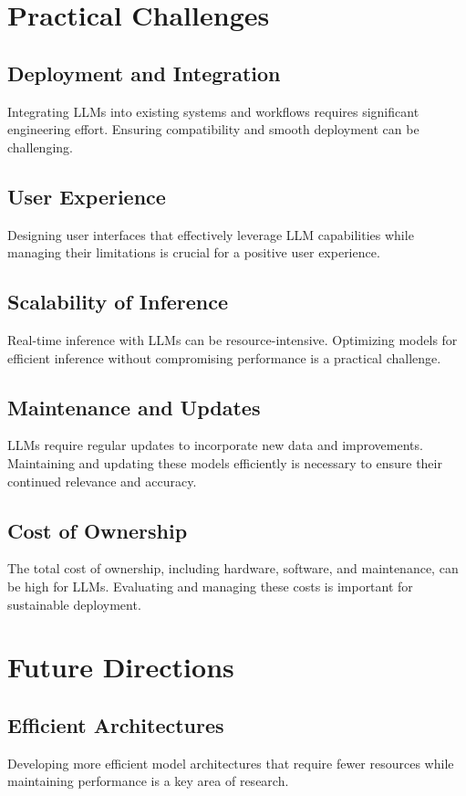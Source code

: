 \section{Practical Challenges}

\subsection{Deployment and Integration}
Integrating LLMs into existing systems and workflows requires significant engineering effort. Ensuring compatibility and smooth deployment can be challenging.

\subsection{User Experience}
Designing user interfaces that effectively leverage LLM capabilities while managing their limitations is crucial for a positive user experience.

\subsection{Scalability of Inference}
Real-time inference with LLMs can be resource-intensive. Optimizing models for efficient inference without compromising performance is a practical challenge.

\subsection{Maintenance and Updates}
LLMs require regular updates to incorporate new data and improvements. Maintaining and updating these models efficiently is necessary to ensure their continued relevance and accuracy.

\subsection{Cost of Ownership}
The total cost of ownership, including hardware, software, and maintenance, can be high for LLMs. Evaluating and managing these costs is important for sustainable deployment.

\section{Future Directions}

\subsection{Efficient Architectures}
Developing more efficient model architectures that require fewer resources while maintaining performance is a key area of research.

